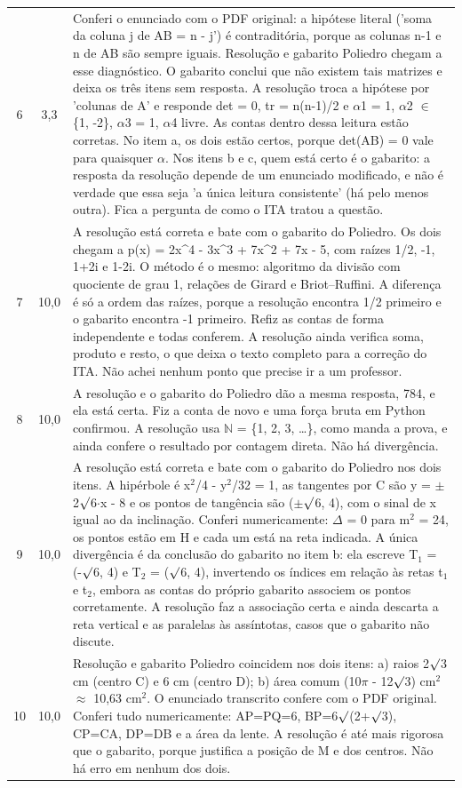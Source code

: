 \documentclass{article}%
\begin{document}
\begin{longtable}{@{}c c p{}@{}}
6 & 3,3 & Conferi o enunciado com o PDF original: a hipótese literal ('soma da coluna j de AB = n - j') é contraditória, porque as colunas n-1 e n de AB são sempre iguais. Resolução e gabarito Poliedro chegam a esse diagnóstico. O gabarito conclui que não existem tais matrizes e deixa os três itens sem resposta. A resolução troca a hipótese por 'colunas de A' e responde det = 0, tr = n(n-1)/2 e $\alpha$1 = 1, $\alpha$2 $\in$ \{1, -2\}, $\alpha$3 = 1, $\alpha$4 livre. As contas dentro dessa leitura estão corretas. No item a, os dois estão certos, porque det(AB) = 0 vale para quaisquer $\alpha$. Nos itens b e c, quem está certo é o gabarito: a resposta da resolução depende de um enunciado modificado, e não é verdade que essa seja 'a única leitura consistente' (há pelo menos outra). Fica a pergunta de como o ITA tratou a questão. \\
7 & 10,0 & A resolução está correta e bate com o gabarito do Poliedro. Os dois chegam a p(x) = 2x\^{}4 - 3x\^{}3 + 7x\^{}2 + 7x - 5, com raízes 1/2, -1, 1+2i e 1-2i. O método é o mesmo: algoritmo da divisão com quociente de grau 1, relações de Girard e Briot--Ruffini. A diferença é só a ordem das raízes, porque a resolução encontra 1/2 primeiro e o gabarito encontra -1 primeiro. Refiz as contas de forma independente e todas conferem. A resolução ainda verifica soma, produto e resto, o que deixa o texto completo para a correção do ITA. Não achei nenhum ponto que precise ir a um professor. \\
8 & 10,0 & A resolução e o gabarito do Poliedro dão a mesma resposta, 784, e ela está certa. Fiz a conta de novo e uma força bruta em Python confirmou. A resolução usa $\mathbb{N}$ = \{1, 2, 3, \ldots{}\}, como manda a prova, e ainda confere o resultado por contagem direta. Não há divergência. \\
9 & 10,0 & A resolução está correta e bate com o gabarito do Poliedro nos dois itens. A hipérbole é x$^2$/4 - y$^2$/32 = 1, as tangentes por C são y = $\pm$2$\surd$6$\cdot$x - 8 e os pontos de tangência são ($\pm$$\surd$6, 4), com o sinal de x igual ao da inclinação. Conferi numericamente: $\Delta$ = 0 para m$^2$ = 24, os pontos estão em H e cada um está na reta indicada. A única divergência é da conclusão do gabarito no item b: ela escreve T$_{1}$ = (-$\surd$6, 4) e T$_{2}$ = ($\surd$6, 4), invertendo os índices em relação às retas t$_{1}$ e t$_{2}$, embora as contas do próprio gabarito associem os pontos corretamente. A resolução faz a associação certa e ainda descarta a reta vertical e as paralelas às assíntotas, casos que o gabarito não discute. \\
10 & 10,0 & Resolução e gabarito Poliedro coincidem nos dois itens: a) raios 2$\surd$3 cm (centro C) e 6 cm (centro D); b) área comum (10$\pi$ - 12$\surd$3) cm$^2$ $\approx$ 10,63 cm$^2$. O enunciado transcrito confere com o PDF original. Conferi tudo numericamente: AP=PQ=6, BP=6$\surd$(2+$\surd$3), CP=CA, DP=DB e a área da lente. A resolução é até mais rigorosa que o gabarito, porque justifica a posição de M e dos centros. Não há erro em nenhum dos dois. \\
\bottomrule\end{longtable}%
\end{document}
